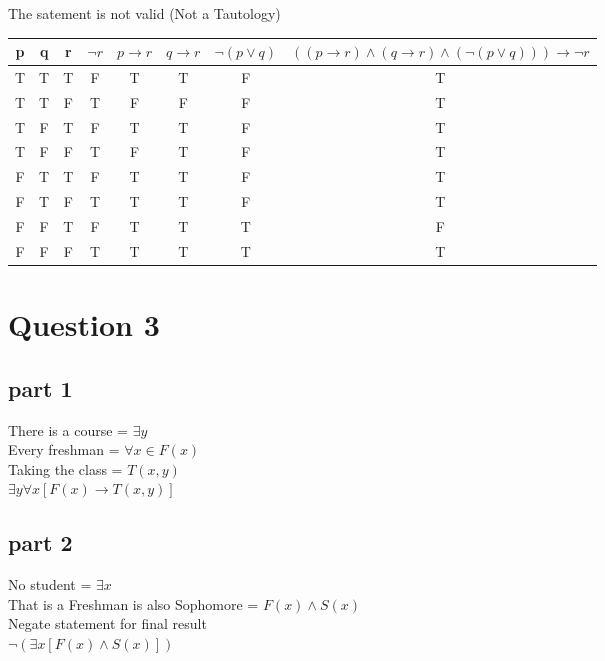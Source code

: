 \documentclass[a4paper,12pt]{article}
\begin{document}
The satement is not valid (Not a Tautology)
\begin{center} %
  \begin{tabular}{ |c|c|c|c|c|c|c|c| } %
    \hline %
    p & q & r & $\neg r$ & $p \to r$ & $q \to r$ & $\neg(p \vee q)$ & $((p \to r) \wedge (q \to r) \wedge (\neg(p \vee q))) \to \neg r$  \\ \hline
    T & T & T & F & T & T & F & T \\ \hline %
    T & T & F & T & F & F & F & T \\ \hline
    T & F & T & F & T & T & F & T \\ \hline
    T & F & F & T & F & T & F & T \\ \hline %
    F & T & T & F & T & T & F & T \\ \hline
    F & T & F & T & T & T & F & T \\ \hline
    F & F & T & F & T & T & T & F \\ \hline
    F & F & F & T & T & T & T & T \\ 
    \hline
  \end{tabular} %
\end{center}


\section{Question 3}
\label{sec6}

\subsection{part 1}
\label{sec7}

There is a course = $\exists y$ \\
Every freshman = $\forall x \in F(x)$ \\
Taking the class = $T(x,y)$ \\
$\exists y \forall x [F(x) \to T(x,y)]$ \\

\subsection{part 2}
\label{sec8}

No student = $\exists x$ \\
That is a Freshman is also Sophomore = $F(x) \wedge S(x)$ \\
Negate statement for final result \\
$\neg(\exists x [F(x) \wedge S(x)])$ \\
\end{document}
